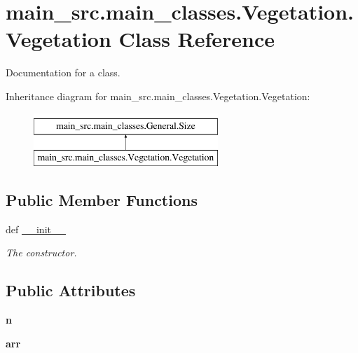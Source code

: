 \hypertarget{classmain__src_1_1main__classes_1_1Vegetation_1_1Vegetation}{\section{main\-\_\-src.\-main\-\_\-classes.\-Vegetation.\-Vegetation Class Reference}
\label{classmain__src_1_1main__classes_1_1Vegetation_1_1Vegetation}
}


Documentation for a class.  


Inheritance diagram for main\-\_\-src.\-main\-\_\-classes.\-Vegetation.\-Vegetation\-:\begin{figure}[H]
\begin{center}
\leavevmode
\includegraphics[height=2.000000cm]{classmain__src_1_1main__classes_1_1Vegetation_1_1Vegetation}
\end{center}
\end{figure}
\subsection*{Public Member Functions}
\begin{DoxyCompactItemize}
\item 
def \hyperlink{classmain__src_1_1main__classes_1_1Vegetation_1_1Vegetation_a89d79aa7f299558bdbec028e4a5d5dac}{\-\_\-\-\_\-init\-\_\-\-\_\-}
\begin{DoxyCompactList}\small\item\em The constructor. \end{DoxyCompactList}\end{DoxyCompactItemize}
\subsection*{Public Attributes}
\begin{DoxyCompactItemize}
\item 
\hypertarget{classmain__src_1_1main__classes_1_1Vegetation_1_1Vegetation_a6990e9c030a804cd682c67a5548b2aaf}{{\bfseries n}}\label{classmain__src_1_1main__classes_1_1Vegetation_1_1Vegetation_a6990e9c030a804cd682c67a5548b2aaf}

\item 
\hypertarget{classmain__src_1_1main__classes_1_1Vegetation_1_1Vegetation_ac85cd828bf23aa859fd12bdf4a9ceae0}{{\bfseries arr}}\label{classmain__src_1_1main__classes_1_1Vegetation_1_1Vegetation_ac85cd828bf23aa859fd12bdf4a9ceae0}

\end{DoxyCompactItemize}


